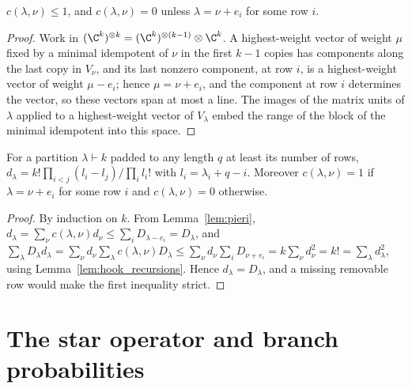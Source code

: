 \begin{lemma}
    \label{lem:pieri}
    \leanok
    $c(\lambda,\nu)\le1$, and $c(\lambda,\nu)=0$ unless $\lambda=\nu+e_i$ for some
    row $i$.
\end{lemma}

\begin{proof}\leanok
    Work in $(\C^k)^{\otimes k}=(\C^k)^{\otimes(k-1)}\otimes\C^k$. A highest-weight
    vector of weight $\mu$ fixed by a minimal idempotent of $\nu$ in the first $k-1$
    copies has components along the last copy in $V_\nu$, and its last nonzero
    component, at row $i$, is a highest-weight vector of weight $\mu-e_i$; hence
    $\mu=\nu+e_i$, and the component at row $i$ determines the vector, so these
    vectors span at most a line. The images of the matrix units of $\lambda$ applied
    to a highest-weight vector of $V_\lambda$ embed the range of the block of the
    minimal idempotent into this space.
\end{proof}

\begin{theorem}
    \label{thm:dim_eq_hook}
    \leanok
    For a partition $\lambda\vdash k$ padded to any length $q$ at least its number of
    rows, $d_\lambda=k!\prod_{i<j}(l_i-l_j)/\prod_il_i!$ with $l_i=\lambda_i+q-i$.
    Moreover $c(\lambda,\nu)=1$ if $\lambda=\nu+e_i$ for some row $i$ and
    $c(\lambda,\nu)=0$ otherwise.
\end{theorem}

\begin{proof}\leanok
    By induction on $k$. From Lemma~\ref{lem:pieri},
    $d_\lambda=\sum_\nu c(\lambda,\nu)d_\nu\le\sum_iD_{\lambda-e_i}=D_\lambda$, and
    $\sum_\lambda D_\lambda d_\lambda=\sum_\nu d_\nu\sum_\lambda c(\lambda,\nu)D_\lambda
    \le\sum_\nu d_\nu\sum_iD_{\nu+e_i}=k\sum_\nu d_\nu^2=k!=\sum_\lambda d_\lambda^2$,
    using Lemma~\ref{lem:hook_recursions}. Hence $d_\lambda=D_\lambda$, and a missing
    removable row would make the first inequality strict.
\end{proof}

\section{The star operator and branch probabilities}

